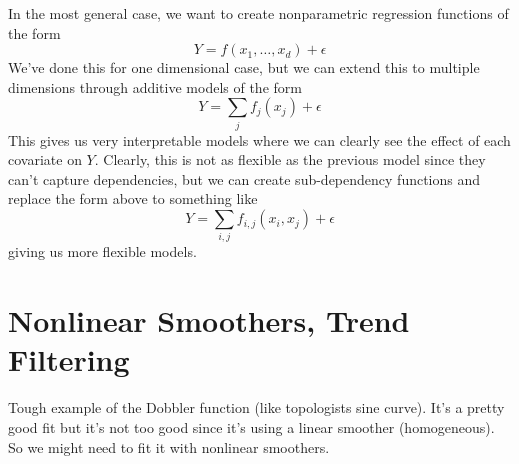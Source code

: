 \documentclass{article}
\begin{document}
  In the most general case, we want to create nonparametric regression functions of the form 
  \begin{equation}
    Y = f(x_1, \ldots, x_d) + \epsilon 
  \end{equation}
  We've done this for one dimensional case, but we can extend this to multiple dimensions through additive models of the form 
  \begin{equation}
    Y = \sum_j f_j (x_j)  + \epsilon
  \end{equation}
  This gives us very interpretable models where we can clearly see the effect of each covariate on $Y$. Clearly, this is not as flexible as the previous model since they can't capture dependencies, but we can create sub-dependency functions and replace the form above to something like 
  \begin{equation}
    Y = \sum_{i, j} f_{i, j} (x_i, x_j) + \epsilon
  \end{equation}
  giving us more flexible models. 

\section{Nonlinear Smoothers, Trend Filtering} 

  Tough example of the Dobbler function (like topologists sine curve). It's a pretty good fit but it's not too good since it's using a linear smoother (homogeneous). So we might need to fit it with nonlinear smoothers. 



\end{document}
